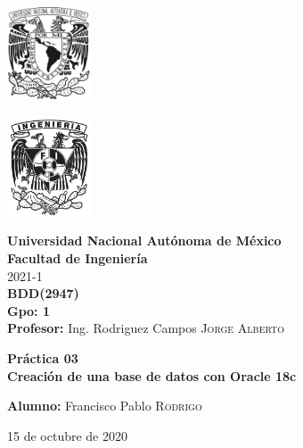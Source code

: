 \documentclass{article}
\newcommand{\materia}{BDD}
\newcommand{\clave}{2947}
\newcommand{\profesor}{Ing. Rodriguez Campos \textsc{Jorge Alberto}}
\newcommand{\semestre}{2021-1}
\newcommand{\alumno}{Francisco Pablo \textsc{Rodrigo}}
\newcommand{\actividad}{Práctica 03}
\newcommand{\titulo}{Creación de una base de datos con Oracle 18c}
\newcommand{\fechaEntrega}{15 de octubre de 2020}
\begin{document}
\thispagestyle{empty}
\begin{minipage}[t][5cm][t]{0.2\linewidth}
    \includegraphics[width=2.5cm]{unam.jpg}
    \vspace{10cm}

    \includegraphics[width=2.5cm]{fiblack}
\end{minipage}
\begin{minipage}[t]{0.7\linewidth}
    \vspace{-2.5cm}
    \LARGE{\textbf{Universidad Nacional Autónoma de México}}\\
    \Large{\textbf{Facultad de Ingeniería}} \\

    \large{\semestre}\\[2cm]

    \large{\textbf{\materia (\clave)}}\\
    \large{\textbf{Gpo: 1}}\\[5mm]
    \large{\textbf{Profesor:} \profesor}\\ [1.5cm]
    \begin{center}
        \LARGE{\textbf{\actividad}}\\
        \LARGE{\textbf{\titulo}}\\
    \end{center}

    \vspace{3.3cm}

    \large{\textbf{Alumno:} \alumno} \\[1.5cm]

    \begin{flushright}
        \fechaEntrega%
    \end{flushright}
\end{minipage}

\newpage
\end{document}
